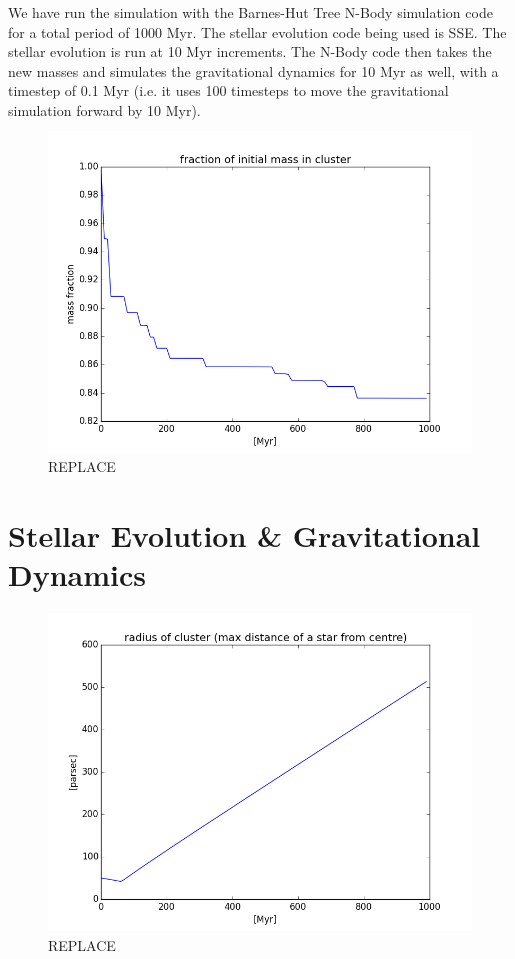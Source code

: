 \documentclass{aa}
\begin{document}
We have run the simulation with the Barnes-Hut Tree N-Body simulation code for a total period of 1000 Myr. The stellar evolution code being used is SSE. The stellar evolution is run at 10 Myr increments. The N-Body code then takes the new masses and simulates the gravitational dynamics for 10 Myr as well, with a timestep of 0.1 Myr (i.e. it uses 100 timesteps to move the gravitational simulation forward by 10 Myr).
\begin{figure}
    \centering
    \includegraphics[width=\hsize]{img/massfraction_over_time.png}
    \caption{REPLACE}\label{fig:massfraction}
\end{figure}



\section{Stellar Evolution \& Gravitational Dynamics} \label{sec:SE_GD}
\begin{figure}
    \centering
    \includegraphics[width=\hsize]{img/cluster_max_radius.png}
    \caption{REPLACE}\label{fig:max_radius}
\end{figure}
\end{document}
